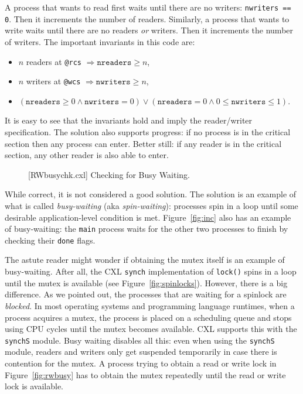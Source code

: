 \documentclass{report}
\newenvironment{code}{
\tcolorbox
}{
\endtcolorbox
}
\begin{document}
A process that wants to read first waits until there are no writers:
\texttt{nwriters == 0}.  Then it increments the number of readers.
Similarly, a
process that wants to write waits until there are no readers \emph{or} writers.
Then it increments the number of writers.
The important invariants in this code are:
\begin{itemize}
\item $n$ readers at \texttt{@rcs} $\Rightarrow \mathtt{nreaders} \ge n$,
\item $n$ writers at \texttt{@wcs} $\Rightarrow \mathtt{nwriters} \ge n$,
\item $(\mathtt{nreaders} \ge 0 \land \mathtt{nwriters} = 0) \lor
    (\mathtt{nreaders} = 0 \land 0 \le \mathtt{nwriters} \le 1)$.
\end{itemize}
It is easy to see that the invariants hold and imply the reader/writer
specification.
The solution also supports progress: if no process is in the critical
section then any process can enter.  Better still: if any reader is in the
critical section, any other reader is also able to enter.

\begin{figure}
\begin{code}
\end{code}
\caption{[RWbusychk.cxl] Checking for Busy Waiting.}
\label{fig:rwblock}
\end{figure}

While correct, it is not considered a good solution.
The solution is an example of what is called \emph{busy-waiting}
(aka \emph{spin-waiting}):
processes spin in a loop until some desirable application-level condition is met.
Figure~\ref{fig:inc} also has an example of busy-waiting: the \texttt{main}
process waits for the other two processes to finish by checking their \texttt{done}
flags.

The astute reader might wonder if obtaining the mutex itself is an
example of busy-waiting.  After all, the CXL \texttt{synch} implementation
of \texttt{lock()} spins in a loop until the mutex is available
(see Figure~\ref{fig:spinlocks}).
However, there is a big difference.  As we pointed out, the processes that
are waiting for a spinlock are \emph{blocked}.
In most operating systems and programming language runtimes,
when a process acquires a mutex, the process is placed on a scheduling
queue and stops using CPU cycles until the mutex becomes available.
CXL supports this with the \texttt{synchS} module.
Busy waiting disables all this: even when using the \texttt{synchS}
module, readers and writers only get suspended temporarily in case
there is contention for the mutex.
A process trying to obtain a read or write lock in
Figure~\ref{fig:rwbusy} has to obtain the mutex repeatedly
until the read or write lock is available.
\end{document}
